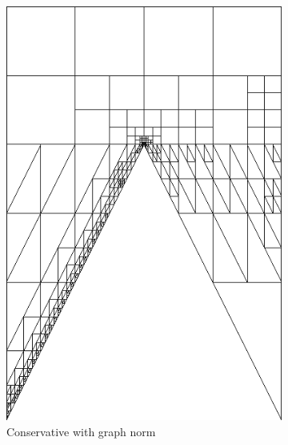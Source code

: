 \documentclass[letterpaper]{article}
\begin{document}
\begin{figure}
\begin{subfigure}[t]{0.4\textwidth}
\includegraphics[width=\textwidth]{figs/Wedge/graph16c_mesh.png}
\caption{Conservative with graph norm}
\label{fig:wedgeGraph16c_mesh}
\end{subfigure}
\begin{subfigure}[t]{0.4\textwidth}
\centering

\end{subfigure}
\end{figure}
\end{document}
